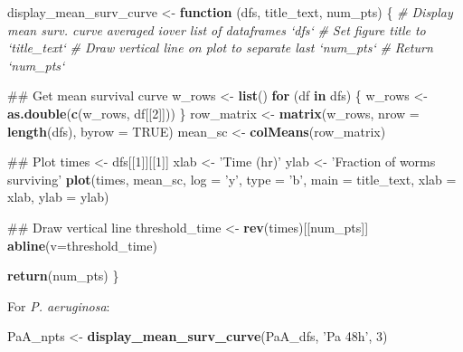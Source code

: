 \documentclass[]{article}
\newenvironment{Shaded}{\begin{snugshade}}{\end{snugshade}}
\newcommand{\KeywordTok}[1]{\textcolor[rgb]{0.13,0.29,0.53}{\textbf{#1}}}
\newcommand{\DataTypeTok}[1]{\textcolor[rgb]{0.13,0.29,0.53}{#1}}
\newcommand{\DecValTok}[1]{\textcolor[rgb]{0.00,0.00,0.81}{#1}}
\newcommand{\StringTok}[1]{\textcolor[rgb]{0.31,0.60,0.02}{#1}}
\newcommand{\CommentTok}[1]{\textcolor[rgb]{0.56,0.35,0.01}{\textit{#1}}}
\newcommand{\OtherTok}[1]{\textcolor[rgb]{0.56,0.35,0.01}{#1}}
\newcommand{\ControlFlowTok}[1]{\textcolor[rgb]{0.13,0.29,0.53}{\textbf{#1}}}
\newcommand{\NormalTok}[1]{#1}
\begin{document}
\begin{Shaded}
\begin{Highlighting}[]
\NormalTok{display_mean_surv_curve <-}\StringTok{ }\ControlFlowTok{function}\NormalTok{ (dfs, title_text, num_pts) \{}
  \CommentTok{# Display mean surv. curve averaged iover list of dataframes `dfs`}
  \CommentTok{# Set figure title to `title_text`}
  \CommentTok{# Draw vertical line on plot to separate last `num_pts`}
  \CommentTok{# Return `num_pts`}
  
\NormalTok{  ## Get mean survival curve}
\NormalTok{  w_rows <-}\StringTok{ }\KeywordTok{list}\NormalTok{()}
  \ControlFlowTok{for}\NormalTok{ (df }\ControlFlowTok{in}\NormalTok{ dfs) \{}
\NormalTok{    w_rows <-}\StringTok{ }\KeywordTok{as.double}\NormalTok{(}\KeywordTok{c}\NormalTok{(w_rows, df[[}\DecValTok{2}\NormalTok{]]))}
\NormalTok{  \}}
\NormalTok{  row_matrix <-}\StringTok{ }\KeywordTok{matrix}\NormalTok{(w_rows, }\DataTypeTok{nrow =} \KeywordTok{length}\NormalTok{(dfs), }\DataTypeTok{byrow =} \OtherTok{TRUE}\NormalTok{)}
\NormalTok{  mean_sc <-}\StringTok{ }\KeywordTok{colMeans}\NormalTok{(row_matrix)}
  
\NormalTok{  ## Plot}
\NormalTok{  times <-}\StringTok{ }\NormalTok{dfs[[}\DecValTok{1}\NormalTok{]][[}\DecValTok{1}\NormalTok{]]}
\NormalTok{  xlab <-}\StringTok{ 'Time (hr)'}
\NormalTok{  ylab <-}\StringTok{ 'Fraction of worms surviving'}
  \KeywordTok{plot}\NormalTok{(times, mean_sc, }\DataTypeTok{log =} \StringTok{'y'}\NormalTok{, }\DataTypeTok{type =} \StringTok{'b'}\NormalTok{, }\DataTypeTok{main =}\NormalTok{ title_text, }\DataTypeTok{xlab =}\NormalTok{ xlab, }\DataTypeTok{ylab =}\NormalTok{ ylab)}
  
\NormalTok{  ## Draw vertical line}
\NormalTok{  threshold_time <-}\StringTok{ }\KeywordTok{rev}\NormalTok{(times)[[num_pts]]}
  \KeywordTok{abline}\NormalTok{(}\DataTypeTok{v=}\NormalTok{threshold_time)}
  
  \KeywordTok{return}\NormalTok{(num_pts)}
\NormalTok{\}}
\end{Highlighting}
\end{Shaded}

For \emph{P. aeruginosa}:

\begin{Shaded}
\begin{Highlighting}[]
\NormalTok{PaA_npts <-}\StringTok{ }\KeywordTok{display_mean_surv_curve}\NormalTok{(PaA_dfs, }\StringTok{'Pa 48h'}\NormalTok{, }\DecValTok{3}\NormalTok{)}
\end{Highlighting}
\end{Shaded}
\end{document}
